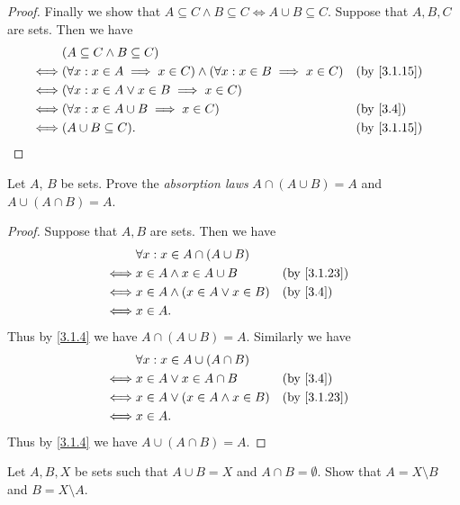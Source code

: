 \begin{proof}
  Finally we show that \(A \subseteq C \land B \subseteq C \iff A \cup B \subseteq C\).
  Suppose that \(A, B, C\) are sets.
  Then we have
  \begin{align*}
         & (A \subseteq C \land B \subseteq C)                                                                  \\
    \iff & (\forall x : x \in A \implies x \in C) \land (\forall x : x \in B \implies x \in C) &  & \by{3.1.15} \\
    \iff & (\forall x : x \in A \lor x \in B \implies x \in C)                                                  \\
    \iff & (\forall x : x \in A \cup B \implies x \in C)                                       &  & \by{3.4}    \\
    \iff & (A \cup B \subseteq C).                                                             &  & \by{3.1.15}
  \end{align*}
\end{proof}

\begin{ex}\label{ex:3.1.8}
  Let \(A\), \(B\) be sets.
  Prove the \emph{absorption laws} \(A \cap (A \cup B) = A\) and \(A \cup (A \cap B) = A\).
\end{ex}

\begin{proof}
  Suppose that \(A, B\) are sets.
  Then we have
  \begin{align*}
         & \forall x : x \in A \cap (A \cup B)                   \\
    \iff & x \in A \land x \in A \cup B         &  & \by{3.1.23} \\
    \iff & x \in A \land (x \in A \lor x \in B) &  & \by{3.4}    \\
    \iff & x \in A.
  \end{align*}
  Thus by \cref{3.1.4} we have \(A \cap (A \cup B) = A\).
  Similarly we have
  \begin{align*}
         & \forall x : x \in A \cup (A \cap B)                   \\
    \iff & x \in A \lor x \in A \cap B          &  & \by{3.4}    \\
    \iff & x \in A \lor (x \in A \land x \in B) &  & \by{3.1.23} \\
    \iff & x \in A.
  \end{align*}
  Thus by \cref{3.1.4} we have \(A \cup (A \cap B) = A\).
\end{proof}

\begin{ex}\label{ex:3.1.9}
  Let \(A, B, X\) be sets such that \(A \cup B = X\) and \(A \cap B = \emptyset\).
  Show that \(A = X \setminus B\) and \(B = X \setminus A\).
\end{ex}

